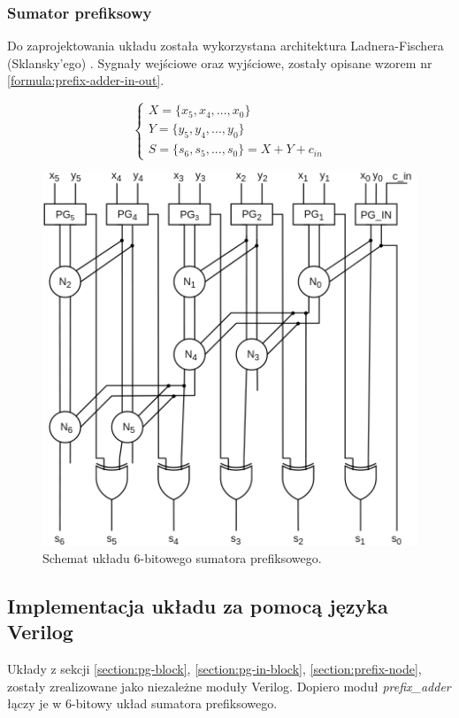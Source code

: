 \documentclass[12pt,oneside,reqno]{article}
\begin{document}
\subsubsection{Sumator prefiksowy}
Do zaprojektowania układu została wykorzystana architektura Ladnera-Fischera (Sklansky’ego) \cite{szybkie-sumatory-2006}. Sygnały wejściowe oraz wyjściowe, zostały opisane wzorem nr \ref{formula:prefix-adder-in-out}.

\begin{equation}
    \begin{cases}
        X = \{x_5, x_4, ..., x_0\} \\
        Y = \{y_5, y_4, ..., y_0\} \\
        S = \{s_6, s_5, ..., s_0\} = X + Y + c_{in}
    \end{cases}
    \label{formula:prefix-adder-in-out}
\end{equation}

\begin{figure}[H]
\centering
\includegraphics[width=\linewidth]{diagrams/prefix_adder.png}
\caption{Schemat układu 6-bitowego sumatora prefiksowego.}\label{fig:diagram_prefix_adder}
\end{figure}


\clearpage
\subsection{Implementacja układu za pomocą języka Verilog}
Układy z sekcji \ref{section:pg-block}, \ref{section:pg-in-block}, \ref{section:prefix-node}, zostały zrealizowane jako niezależne moduły Verilog. Dopiero moduł \textit{prefix\_adder} łączy je w 6-bitowy układ sumatora prefiksowego.
\end{document}
